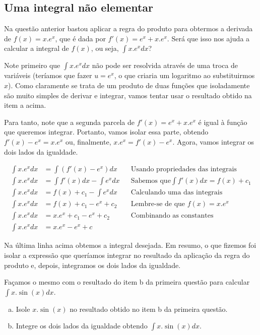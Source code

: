 \documentclass[main_estudante.tex]{subfiles}
\begin{document}
\subsection*{Uma integral não elementar}

Na questão anterior bastou aplicar a regra do produto para obtermos a derivada de $f(x)=x . e^x$, que é dada por $f'(x)=e^x+x.e^x$. Será que isso nos ajuda a calcular a integral de $f(x)$, ou seja, $\int x . e^x dx$?

Note primeiro que $\int x . e^x dx$ não pode ser resolvida através de uma troca de variáveis (teríamos que fazer $u=e^x$, o que criaria um logaritmo ao substituirmos $x$). Como claramente se trata de um produto de duas funções que isoladamente são muito simples de derivar e integrar, vamos tentar usar o resultado obtido na item a acima.

Para tanto, note que a segunda parcela de $f'(x)=e^x+x.e^x$ é igual à função que queremos integrar. Portanto, vamos isolar essa parte, obtendo $f'(x)-e^x=x.e^x$ ou, finalmente, $x.e^x=f'(x)-e^x$. Agora, vamos integrar os dois lados da igualdade.

\begin{align*}
\int x.e^x dx &= \int (f'(x)-e^x) dx && \text{Usando propriedades das integrais}\\
\int x.e^x dx &= \int f'(x) dx - \int e^x dx && \text{Sabemos que} \int f'(x) dx = f(x)+c_1 \\
\int x.e^x dx &= f(x)+c_1 - \int e^x dx && \text{Calculando uma das integrais}\\
\int x.e^x dx &= f(x)+c_1 - e^x+c_2 && \text{Lembre-se de que } f(x)=x . e^x\\
\int x.e^x dx &= x . e^x+c_1 - e^x+c_2 && \text{Combinando as constantes} \\
\int x.e^x dx &= x . e^x - e^x+c
\end{align*}

Na última linha acima obtemos a integral desejada. Em resumo, o que fizemos foi isolar a expressão que queríamos integrar no resultado da aplicação da regra do produto e, depois, integramos os dois lados da igualdade.

\begin{questao}
Façamos o mesmo com o resultado do item b da primeira questão para calcular $\int x . \sin(x) dx$.
\begin{enumerate}[a)]
\item Isole $x . \sin(x)$ no resultado obtido no item b da primeira questão.
\item Integre os dois lados da igualdade obtendo $\int x . \sin(x) dx$.
\end{enumerate}
\end{questao}
\end{document}
